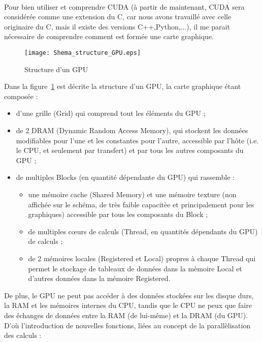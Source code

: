 \documentclass[a4paper,12pt]{article}
\begin{document}
{	\\ \indent Pour bien utiliser et comprendre CUDA (\`a partir de maintenant, CUDA sera consid\'e{}r\'e{}e comme une extension du C, car nous avons travaill\'e{} avec celle originaire du C, mais il existe des versions C++,Python,...), il me parait n\'e{}cessaire de comprendre comment est form\'e{}e une carte graphique.
	\begin{figure}
	    \centering
	    \caption{Structure d'un GPU}
	    \label{fig:structGPU}
	    \texttt{[image: Shema\_structure\_GPU.eps]}
	\end{figure}
    Dans la figure~\ref{fig:structGPU} est décrite la structure d'un GPU, la carte graphique \'e{}tant compos\'e{}e :
    \begin{itemize}
        \item d'une grille (Grid) qui comprend tout les \'e{}l\'e{}ments du GPU ;
        \item de 2 DRAM (Dynamic Random Access Memory), qui stockent les donn\'e{}es modifiables pour l'une et les constantes pour l'autre, accessible par l'h\^ote (i.e. le CPU, et seulement par transfert) et par tous les autres composants du GPU ;
        \item de multiples Blocks (en quantit\'e{} d\'e{}pendante du GPU) qui rassemble :
        \begin{itemize}[label=$+$]
            \item une m\'e{}moire cache (Shared Memory) et une m\'e{}moire texture (non affich\'e{}e sur le sch\'e{}ma, de tr\`es faible capacit\`e{}e et principalement pour les graphiques) accessible par tous les composants du Block ;
            \item de multiples c\oe{}urs de calculs (Thread, en quantit\'e{}s d\'e{}pendants du GPU) de calculs ;
            \item de 2 m\'e{}moires locales (Registered et Local) propres \`a chaque Thread qui permet le stockage de tableaux de donn\'e{}es dans la m\`emoire Local et d'autres donn\'e{}es dans la m\'e{}moire Registered.
        \end{itemize}
    \end{itemize}
    De plus, le GPU ne peut pas acc\'e{}der \`a des donn\'e{}es stock\'e{}es sur les disque durs, la RAM et les m\'e{}moires internes du CPU, tandis que le CPU ne peux que faire des \'e{}changes de donn\'e{}es entre la RAM (de lui-m\^eme) et la DRAM (du GPU). \\
    D'o\`u l'introduction de nouvelles fonctions, li\'e{}es au concept de la parall\`elisation des calculs :
}
\end{document}
